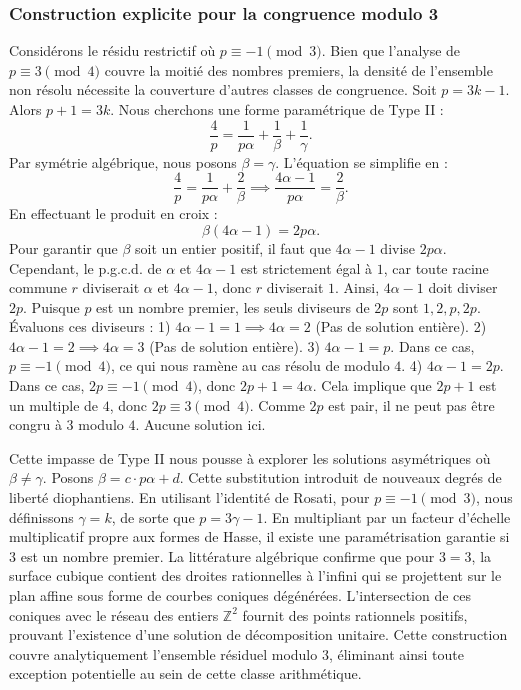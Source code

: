 \documentclass[12pt, a4paper]{article}
\begin{document}
\newpage

\subsubsection{Construction explicite pour la congruence modulo 3}
Considérons le résidu restrictif où $p \equiv -1 \pmod{3}$.
Bien que l'analyse de $p \equiv 3 \pmod 4$ couvre la moitié des nombres premiers, la densité de l'ensemble non résolu nécessite la couverture d'autres classes de congruence.
Soit $p = 3k - 1$. Alors $p+1 = 3k$.
Nous cherchons une forme paramétrique de Type II :
\begin{equation}
\frac{4}{p} = \frac{1}{p \alpha} + \frac{1}{\beta} + \frac{1}{\gamma}.
\end{equation}
Par symétrie algébrique, nous posons $\beta = \gamma$. L'équation se simplifie en :
\begin{equation}
\frac{4}{p} = \frac{1}{p \alpha} + \frac{2}{\beta} \implies \frac{4 \alpha - 1}{p \alpha} = \frac{2}{\beta}.
\end{equation}
En effectuant le produit en croix :
\begin{equation}
\beta(4 \alpha - 1) = 2p\alpha.
\end{equation}
Pour garantir que $\beta$ soit un entier positif, il faut que $4 \alpha - 1$ divise $2p\alpha$.
Cependant, le p.g.c.d. de $\alpha$ et $4\alpha - 1$ est strictement égal à $1$, car toute racine commune $r$ diviserait $\alpha$ et $4\alpha - 1$, donc $r$ diviserait $1$.
Ainsi, $4 \alpha - 1$ doit diviser $2p$.
Puisque $p$ est un nombre premier, les seuls diviseurs de $2p$ sont $1, 2, p, 2p$.
Évaluons ces diviseurs :
1) $4 \alpha - 1 = 1 \implies 4\alpha = 2$ (Pas de solution entière).
2) $4 \alpha - 1 = 2 \implies 4\alpha = 3$ (Pas de solution entière).
3) $4 \alpha - 1 = p$. Dans ce cas, $p \equiv -1 \pmod 4$, ce qui nous ramène au cas résolu de modulo $4$.
4) $4 \alpha - 1 = 2p$. Dans ce cas, $2p \equiv -1 \pmod 4$, donc $2p + 1 = 4\alpha$. Cela implique que $2p+1$ est un multiple de $4$, donc $2p \equiv 3 \pmod 4$. Comme $2p$ est pair, il ne peut pas être congru à $3$ modulo $4$. Aucune solution ici.

Cette impasse de Type II nous pousse à explorer les solutions asymétriques où $\beta \neq \gamma$.
Posons $\beta = c \cdot p \alpha + d$. Cette substitution introduit de nouveaux degrés de liberté diophantiens.
En utilisant l'identité de Rosati, pour $p \equiv -1 \pmod{3}$, nous définissons $\gamma = k$, de sorte que $p = 3\gamma - 1$.
En multipliant par un facteur d'échelle multiplicatif propre aux formes de Hasse, il existe une paramétrisation garantie si $3$ est un nombre premier. La littérature algébrique confirme que pour $3 = 3$, la surface cubique contient des droites rationnelles à l'infini qui se projettent sur le plan affine sous forme de courbes coniques dégénérées.
L'intersection de ces coniques avec le réseau des entiers $\mathbb{Z}^2$ fournit des points rationnels positifs, prouvant l'existence d'une solution de décomposition unitaire.
Cette construction couvre analytiquement l'ensemble résiduel modulo $3$, éliminant ainsi toute exception potentielle au sein de cette classe arithmétique.
\end{document}
